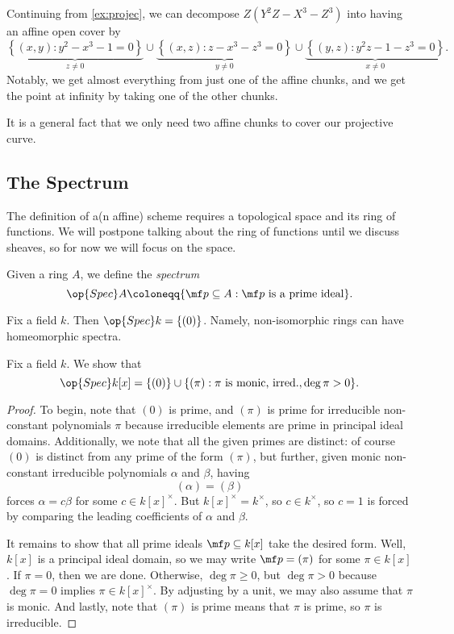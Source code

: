 \documentclass[../notes.tex]{subfiles}
\begin{document}
\begin{example}
	Continuing from \autoref{ex:projec}, we can decompose $Z\left(Y^2Z-X^3-Z^3\right)$ into having an affine open cover by
	\[\underbrace{\left\{(x,y):y^2-x^3-1=0\right\}}_{z\ne0}\cup\underbrace{\left\{(x,z):z-x^3-z^3=0\right\}}_{y\ne0}\cup\underbrace{\left\{(y,z):y^2z-1-z^3=0\right\}}_{x\ne0}.\]
	Notably, we get almost everything from just one of the affine chunks, and we get the point at infinity by taking one of the other chunks.
\end{example}
\begin{remark}
	It is a general fact that we only need two affine chunks to cover our projective curve.
\end{remark}

\subsection{The Spectrum}
The definition of a(n affine) scheme requires a topological space and its ring of functions. We will postpone talking about the ring of functions until we discuss sheaves, so for now we will focus on the space.
\begin{definition}[Spectrum]
	Given a ring $A$, we define the \textit{spectrum}
	\[\op{Spec}A\coloneqq\{\mf p\subseteq A:\mf p\text{ is a prime ideal}\}.\]
\end{definition}
\begin{example}
	Fix a field $k$. Then $\op{Spec}k=\{(0)\}$. Namely, non-isomorphic rings can have homeomorphic spectra.
\end{example}
\begin{exe}
	Fix a field $k$. We show that
	\[\op{Spec}k[x]=\{(0)\}\cup\{(\pi):\pi\text{ is monic, irred.},\deg\pi>0\}.\]
\end{exe}
\begin{proof}
	To begin, note that $(0)$ is prime, and $(\pi)$ is prime for irreducible non-constant polynomials $\pi$ because irreducible elements are prime in principal ideal domains. Additionally, we note that all the given primes are distinct: of course $(0)$ is distinct from any prime of the form $(\pi)$, but further, given monic non-constant irreducible polynomials $\alpha$ and $\beta$, having
	\[(\alpha)=(\beta)\]
	forces $\alpha=c\beta$ for some $c\in k[x]^\times$. But $k[x]^\times=k^\times$, so $c\in k^\times$, so $c=1$ is forced by comparing the leading coefficients of $\alpha$ and $\beta$.

	It remains to show that all prime ideals $\mf p\subseteq k[x]$ take the desired form. Well, $k[x]$ is a principal ideal domain, so we may write $\mf p=(\pi)$ for some $\pi\in k[x]$. If $\pi=0$, then we are done. Otherwise, $\deg\pi\ge0$, but $\deg\pi>0$ because $\deg\pi=0$ implies $\pi\in k[x]^\times$. By adjusting by a unit, we may also assume that $\pi$ is monic. And lastly, note that $(\pi)$ is prime means that $\pi$ is prime, so $\pi$ is irreducible.
\end{proof}
\end{document}
